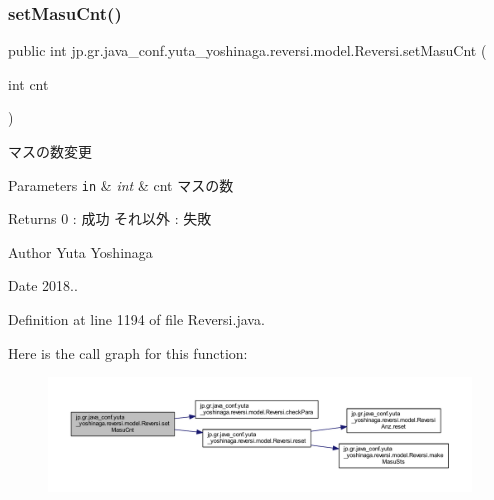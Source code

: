 \subsubsection{\texorpdfstring{set\+Masu\+Cnt()}{setMasuCnt()}}
{\footnotesize\ttfamily public int jp.\+gr.\+java\+\_\+conf.\+yuta\+\_\+yoshinaga.\+reversi.\+model.\+Reversi.\+set\+Masu\+Cnt (\begin{DoxyParamCaption}\item[{int}]{cnt }\end{DoxyParamCaption})}



マスの数変更 


\begin{DoxyParams}[1]{Parameters}
\mbox{\tt in}  & {\em int} & cnt マスの数 \\
\hline
\end{DoxyParams}
\begin{DoxyReturn}{Returns}
0 \+: 成功 それ以外 \+: 失敗 
\end{DoxyReturn}
\begin{DoxyAuthor}{Author}
Yuta Yoshinaga 
\end{DoxyAuthor}
\begin{DoxyDate}{Date}
2018.. 
\end{DoxyDate}


Definition at line 1194 of file Reversi.\+java.

Here is the call graph for this function\+:\nopagebreak
\begin{figure}[H]
\begin{center}
\leavevmode
\includegraphics[width=350pt]{classjp_1_1gr_1_1java__conf_1_1yuta__yoshinaga_1_1reversi_1_1model_1_1_reversi_a0e9bc15d570635cf024287fbf541b4b9_cgraph}
\end{center}
\end{figure}
\mbox{\label{classjp_1_1gr_1_1java__conf_1_1yuta__yoshinaga_1_1reversi_1_1model_1_1_reversi_a7abf9238b933653eec2908f6e1a863db}} 

